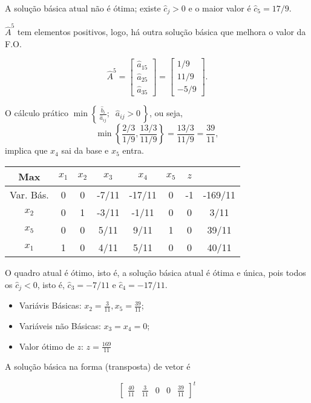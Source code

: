 A solução básica atual não é ótima; existe $ \widehat{c}_j > 0 $ e o maior valor
é $ \widehat{c}_5 = 17/9 $.

$ \widehat{A}^{5} $ tem elementos positivos, logo, há outra solução básica que
melhora o valor da F.O.

\[
  \widehat{A}^{5} =
  \begin{bmatrix}
    \widehat{a}_{15} \\
    \widehat{a}_{25} \\
    \widehat{a}_{35}
  \end{bmatrix} 
  =
  \begin{bmatrix}
     1/9  \\
     11/9 \\
    -5/9
  \end{bmatrix} .
\]

O cálculo prático $\min \left\{\,\frac{\widehat{b}_i}{\widehat{a}_{ij}};\;\; \widehat{a}_{ij} > 0\,\right\}$,
ou seja, 
\[
  \min \left\{\frac{2/3}{1/9}, \frac{13/3}{11/9}\right\}  
  =
  \frac{13/3}{11/9}
  = 
  \frac{39}{11},
\]
implica que $ x_4 $ sai da base e $ x_5 $ entra.

\newpage

\begin{table}[!htbp]
  \centering
  \begin{tabular}{c|cccccc|c}
    Max       & $x_1$ & $x_2$ & $x_3$ & $x_4$  & $x_5$ & $z$ &         \\ \hline
    Var. Bás. & 0     & 0     & -7/11 & -17/11 & 0     & -1  & -169/11 \\ \hline
    $x_2$     & 0     & 1     & -3/11 & -1/11  & 0     &  0  & 3/11    \\
    $x_5$     & 0     & 0     &  5/11 &  9/11  & 1     &  0  & 39/11   \\
    $x_1$     & 1     & 0     &  4/11 &  5/11  & 0     &  0  & 40/11
  \end{tabular}
\end{table}

O quadro atual é ótimo, isto é, a solução básica atual é ótima e única, pois 
todos os $ \widehat{c}_j < 0 $, isto é, $ \widehat{c}_3  = -7/11 $ e 
$ \widehat{c}_4 = -17/11 $.

\begin{itemize}
  \item Variávis Básicas: $ x_2 = \frac{3}{11}, x_5 = \frac{39}{11} $;
  \item Variáveis não Básicas: $ x_3 = x_4 = 0 $;
  \item Valor ótimo de $z$: $ z = \frac{169}{11}$
\end{itemize}

A solução básica na forma (transposta) de vetor é 

\[
  \begin{bmatrix}
    \frac{40}{11} & \frac{3}{11} & 0 & 0 & \frac{39}{11}
  \end{bmatrix}^t  
\]